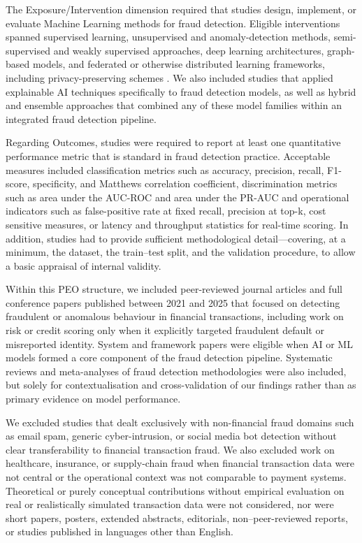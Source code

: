\documentclass[a4paper,fleqn]{cas-dc}
\begin{document}
The Exposure/Intervention dimension required that studies design, implement, or evaluate Machine Learning methods for fraud detection. Eligible interventions spanned supervised learning, unsupervised and anomaly-detection methods, semi-supervised and weakly supervised approaches, deep learning architectures, graph-based models, and federated or otherwise distributed learning frameworks, including privacy-preserving schemes \cite{baabdullah_efficiency_2024, dang_comprehensive_2024}. 
We also included studies that applied explainable AI techniques specifically to fraud detection models, as well as hybrid and ensemble approaches that combined any of these model families within an integrated fraud detection pipeline.

Regarding Outcomes, studies were required to report at least one quantitative performance metric that is standard in fraud detection practice. 
Acceptable measures included classification metrics such as accuracy, precision, recall, F1-score, specificity, and Matthews correlation coefficient, discrimination metrics such as area under the AUC-ROC and area under the PR-AUC and operational indicators such as false-positive rate at fixed recall, precision at top-k, cost sensitive measures, or latency and throughput statistics for real-time scoring. 
In addition, studies had to provide sufficient methodological detail—covering, at a minimum, the dataset, the train–test split, and the validation procedure, to allow a basic appraisal of internal validity.

Within this PEO structure, we included peer-reviewed journal articles and full conference papers published between 2021 and 2025 that focused on detecting fraudulent or anomalous behaviour in financial transactions, including work on risk or credit scoring only when it explicitly targeted fraudulent default or misreported identity. 
System and framework papers were eligible when AI or ML models formed a core component of the fraud detection pipeline. 
Systematic reviews and meta-analyses of fraud detection methodologies were also included, but solely for contextualisation and cross-validation of our findings rather than as primary evidence on model performance.

We excluded studies that dealt exclusively with non-financial fraud domains such as email spam, generic cyber-intrusion, or social media bot detection without clear transferability to financial transaction fraud. 
We also excluded work on healthcare, insurance, or supply-chain fraud when financial transaction data were not central or the operational context was not comparable to payment systems. 
Theoretical or purely conceptual contributions without empirical evaluation on real or realistically simulated transaction data were not considered, nor were short papers, posters, extended abstracts, editorials, non–peer-reviewed reports, or studies published in languages other than English.
\end{document}
